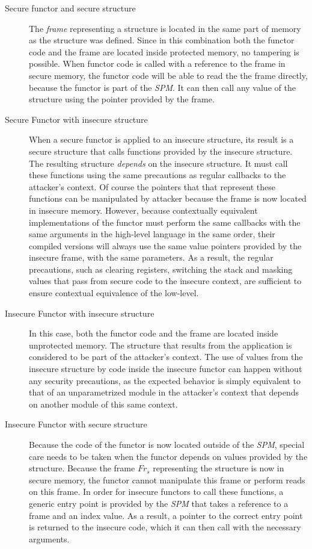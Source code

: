 \documentclass[10pt,a4paper,master=cws, masteroption=ai,english,inputenc=utf8]{kulemt}
\begin{document}
\begin{description}
\item[Secure functor and secure structure] 
The \emph{frame} representing a structure is located in the same part of memory as the structure was defined.
Since in this combination both the functor code and the frame are located inside protected memory, no tampering is possible.
When functor code is called with a reference to the frame in secure memory, the functor code will be able to read the the frame directly, because the functor is part of the \emph{SPM}. It can then call any value of the structure using the pointer provided by the frame.
\item[Secure Functor with insecure structure]
When a secure functor is applied to an insecure structure, its result is a secure structure that calls functions provided by the insecure structure.
The resulting structure \emph{depends} on the insecure structure.
It must call these functions using the same precautions as regular callbacks to the attacker's context.
Of course the pointers that that represent these functions can be manipulated by attacker because the frame is now located in insecure memory.
However, because contextually equivalent implementations of the functor must perform the same callbacks with the same arguments in the high-level language in the same order, their compiled versions will always use the same value pointers provided by the insecure frame, with the same parameters. 
As a result, the regular precautions, such as clearing registers, switching the stack and masking values that pass from secure code to the insecure context, are sufficient to ensure contextual equivalence of the low-level.
\item[Insecure Functor with insecure structure]
In this case, both the functor code and the frame are located inside unprotected memory.
The structure that results from the application is considered to be part of the attacker's context.
The use of values from the insecure structure by code inside the insecure functor can happen without any security precautions, as the expected behavior is simply equivalent to that of an unparametrized module in the attacker's context that depends on another module of this same context.
\item[Insecure Functor with secure structure]
Because the code of the functor is now located outside of the \emph{SPM}, special care needs to be taken when the functor depends on values provided by the structure.
Because the frame $Fr_{s}$ representing the structure is now in secure memory, the functor cannot manipulate this frame or perform reads on this frame.
In order for insecure functors to call these functions, a generic entry point is provided by the \emph{SPM} that takes a reference to a frame and an index value. 
As a result, a pointer to the correct entry point is returned to the insecure code, which it can then call with the necessary arguments.
\end{description}
\end{document}
